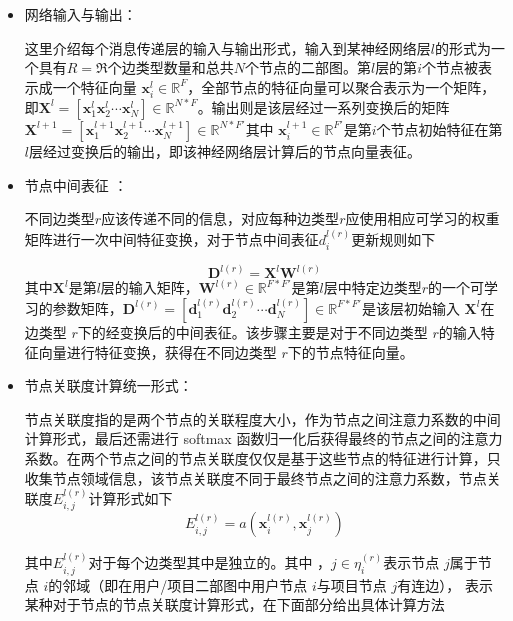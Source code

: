 \documentclass{ctexart}
\begin{document}
\begin{itemize}
    \item 网络输入与输出：
    
    这里介绍每个消息传递层的输入与输出形式，输入到某神经网络层$l$的形式为一个具有$R = \mathfrak{R} $个边类型数量和总共$N$个节点的二部图。第$l$层的第$i$个节点被表示成一个特征向量 $\mathbf{x}_i^l\in\mathbb{R}^F$，全部节点的特征向量可以聚合表示为一个矩阵，即$\mathbf{X}^l=[\mathbf{x}_1^l\mathbf{x}_2^l\cdots \mathbf{x}_N^l]\in\mathbb{R}^{N*F}$。输出则是该层经过一系列变换后的矩阵$\mathbf{X}^{l+1}=[\mathbf{x}_1^{l+1}\mathbf{x}_2^{l+1}\cdots \mathbf{x}_N^{l+1}]\in\mathbb{R}^{N*F'}$其中 $\mathbf{x}_i^{l+1}\in\mathbb{R}^{F'}$是第$i$个节点初始特征在第 $l$层经过变换后的输出，即该神经网络层计算后的节点向量表征。

    \item 节点中间表征 ：
    
    不同边类型$r$应该传递不同的信息，对应每种边类型$r$应使用相应可学习的权重矩阵进行一次中间特征变换，对于节点中间表征$d_i^{l(r)}$更新规则如下


    \begin{equation}
        \mathbf{D}^{l(r)}=\mathbf{X}^l\mathbf{W}^{l(r)}
    \label{}
    \end{equation}
​    
其中$\mathbf{X}^l$是第$l$层的输入矩阵，$\mathbf{W}^{l(r)}\in\mathbb{R}^{F*F'}$是第$l$层中特定边类型$r$的一个可学习的参数矩阵，$\mathbf{D}^{l(r)}=[\mathbf{d}_1^{l(r)}\mathbf{d}_2^{l(r)}\cdots \mathbf{d}_N^{l(r)}]\in\mathbb{R}^{F*F'}$是该层初始输入 $\mathbf{X}^l$在边类型 $r$下的经变换后的中间表征。该步骤主要是对于不同边类型 $r$的输入特征向量进行特征变换，获得在不同边类型 $r$下的节点特征向量。
    \item 节点关联度计算统一形式：
    
    节点关联度指的是两个节点的关联程度大小，作为节点之间注意力系数的中间计算形式，最后还需进行 softmax 函数归一化后获得最终的节点之间的注意力系数。在两个节点之间的节点关联度仅仅是基于这些节点的特征进行计算，只收集节点领域信息，该节点关联度不同于最终节点之间的注意力系数，节点关联度$E_{i,j}^{l(r)}$计算形式如下
\begin{equation}
    E_{i,j}^{l(r)}=a(\mathbf{x}_i^{l(r)},\mathbf{x}_j^{l(r)})
\end{equation}
  
其中$E_{i,j}^{l(r)}$对于每个边类型其中是独立的。其中 ，$j\in \eta_i^{(r)}$表示节点 $j$属于节点 $i$的邻域（即在用户/项目二部图中用户节点 $i$与项目节点 $j$有连边）， 表示某种对于节点的节点关联度计算形式，在下面部分给出具体计算方法


\end{itemize}
\end{document}
